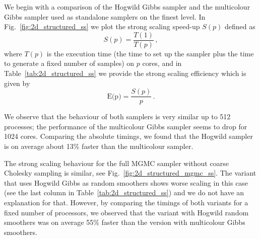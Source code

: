\documentclass[
fontsize=11pt,
paper=a4,
numbers=noenddot
]{scrartcl}
\begin{document}
We begin with a comparison of the Hogwild Gibbs sampler and the multicolour Gibbs sampler used as standalone samplers on the finest level. In Fig.~\ref{fig:2d_structured_ss} we plot the strong scaling speed-up $S(p)$ defined as
\begin{equation*}
    S(p) = \frac{T(1)}{T(p)}\,,
\end{equation*}
where $T(p)$ is the execution time (the time to set up the sampler plus the time to generate a fixed number of samples) on $p$ cores, and in Table~\ref{tab:2d_structured_ss} we provide the strong scaling efficiency which is given by
\begin{equation*}
    \text{E(p)} = \frac{S(p)}{p}\,.
\end{equation*}

We observe that the behaviour of both samplers is very similar up to 512 processes; the performance of the multicolour Gibbs sampler seems to drop for 1024 cores. Comparing the absolute timings, we found that the Hogwild sampler is on average about 13\% faster than the multicolour sampler.

The strong scaling behaviour for the full MGMC sampler without coarse Cholesky sampling is similar, see Fig.~\ref{fig:2d_structured_mgmc_ss}. The variant that uses Hogwild Gibbs as random smoothers shows worse scaling in this case (see the last column in Table~\ref{tab:2d_structured_ss}) and we do not have an explanation for that. However, by comparing the timings of both variants for a fixed number of processors, we observed that the variant with Hogwild random smoothers was on average 55\% faster than the version with multicolour Gibbs smoothers.
\end{document}
